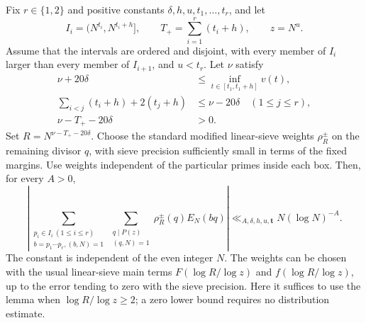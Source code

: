 \begin{lemma}
\label{lem:prefix-interface}
Fix $r\in\{1,2\}$ and positive constants $\delta,h,u,t_1,\ldots,t_r$,
and let
\[
 I_i=(N^{t_i},N^{t_i+h}],\qquad
 T_+=\sum_{i=1}^r(t_i+h),\qquad z=N^u.
\]
Assume that the intervals are ordered and disjoint, with every member
of $I_i$ larger than every member of $I_{i+1}$, and $u<t_r$.
Let $\nu$ satisfy
\begin{align}
 \nu+20\delta&\le\inf_{t\in[t_1,t_1+h]}v(t),
       \label{eq:prefix-level-margin}\\
 \sum_{i<j}(t_i+h)+2(t_j+h)&\le\nu-20\delta
       \quad(1\le j\le r),
       \label{eq:prefix-vector-margin}\\
 \nu-T_+-20\delta&>0.
       \label{eq:prefix-residual-positive}
\end{align}
Set $R=N^{\nu-T_+-20\delta}$. Choose the standard modified
linear-sieve weights $\rho_R^{\pm}$ on the remaining divisor $q$,
with sieve precision sufficiently small in terms of the fixed margins.
Use weights independent of the particular primes inside each box.
Then, for every $A>0$,
\begin{equation}\label{eq:prefix-remainder}
 \left|\sum_{\substack{p_i\in I_i\ (1\le i\le r)\\
                         b=p_1\cdots p_r, (b,N)=1}}
       \sum_{\substack{q\mid P(z)\\(q,N)=1}}
       \rho_R^{\pm}(q)E_N(bq)\right|
 \ll_{A,\delta,h,u,\boldsymbol t}N(\log N)^{-A}.
\end{equation}
The constant is independent of the even integer $N$.
The weights can be chosen with the usual linear-sieve main terms
$F(\log R/\log z)$ and $f(\log R/\log z)$, up to the error tending
to zero with the sieve precision. Here it suffices to use the lemma
when $\log R/\log z\ge2$; a zero lower bound requires no distribution
estimate.
\end{lemma}

